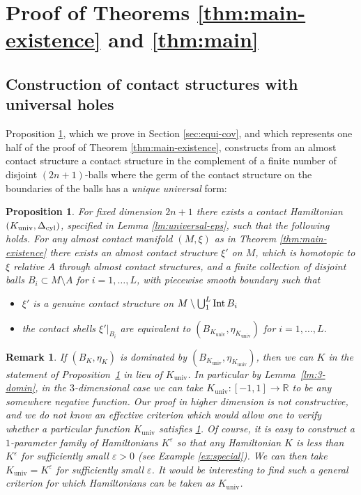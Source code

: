 \documentclass[12pt]{paper}
\theoremstyle{plain}
\newtheorem{proposition}[theorem]{Proposition}
\newtheorem{remark}[theorem]{Remark}
\theoremstyle{definition}
\newcommand{\eps}{\varepsilon}
\newcommand{\R}{{\mathbb{R}}}
\newcommand{\cyl}{{\rm cyl}}
\newcommand{\Int}{{\rm Int\,}} %
\newcommand{\univ}{\mathrm{univ}}
\numberwithin{figure}{section}
\begin{document}
 \section{Proof of Theorems
  \ref{thm:main-existence} and \ref{thm:main}\label{sec:main-existence}}
\subsection{Construction of contact structures with universal holes}\label{sec:univ-holes}
  

Proposition \ref{prop:unique-model}, which we prove in  Section \ref{sec:equi-cov}, and which represents one half
of the proof of Theorem \ref{thm:main-existence}, constructs from an almost contact structure a contact structure in the complement  of a finite number of disjoint  $(2n+1)$-balls where the germ of the contact structure on the boundaries of the balls has a 
 {\em unique universal} form:
 \begin{proposition}\label{prop:unique-model}
 For fixed dimension $2n+1$ there exists a contact Hamiltonian $(K_{\univ}, \Delta_{\cyl})$,
 specified in Lemma \ref{lm:universal-eps}, such that the following holds. 
 For any almost contact manifold $(M, \xi)$ as in Theorem \ref{thm:main-existence}
  there exists an almost contact structure $\xi'$ on $M$, which is homotopic   to $\xi$ relative $A$ through almost contact structures,
and a finite collection of
 disjoint balls $B_i\subset M\setminus A$ for $i=1,\dots, L$, with piecewise smooth boundary such that
 \begin{itemize}
 \item $\xi'$ is a genuine contact structure on $M\setminus \bigcup_1^L\Int B_i$
 \item the contact shells $\xi'|_{B_i}$ are equivalent to
 $(B_{K_{\univ}},\eta_{K_\univ})$
 for $i=1, \dots, L$.
 \end{itemize}
 \end{proposition}

 \begin{remark} {\rm  If $(B_K, \eta_K)$ is dominated by $(B_{K_{\univ}},\eta_{K_\univ})$, then we can $K$
 in the statement of Proposition~\ref{prop:unique-model} in lieu of $K_\univ$.
  In particular by Lemma~\ref{lm:3-domin}, in {\em the $3$-dimensional case}
  we can take $K_\univ: [-1, 1] \to \R$ to be {\em any somewhere negative function.}
  Our proof in higher dimension is not constructive, and   we do not know an effective criterion which would allow one to verify whether a particular function $K_\univ$  satisfies  \ref{prop:unique-model}. Of course, it is easy to construct a $1$-parameter family of Hamiltonians $K^\eps$ so that any Hamiltonian $K$ is less than $K^\eps$ for sufficiently small $\eps>0$ (see Example \ref{ex:special}). We can then take $K_\univ = K^\eps$ for sufficiently small $\eps$. It would be interesting to find such a general criterion for which Hamiltonians can be taken as $K_\univ$.}
\end{remark}
\end{document}
